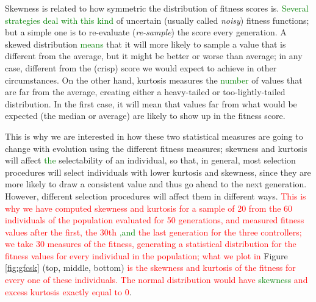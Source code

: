 \documentclass[10pt,journal,compsoc]{IEEEtran}
\begin{document}
Skewness is related to how symmetric the distribution of fitness
scores is.  \textcolor{green}{Several strategies deal with this kind} of
uncertain (usually called {\em noisy}) fitness functions; but a simple
one is to re-evaluate ({\em re-sample}) the score every generation. A
skewed distribution  \textcolor{green}{means} that it will more likely to sample a value
that is different from the average, but it might be better or worse
than average; in any case, different from the (crisp) score we would expect to
achieve in other circumstances. On the other hand, kurtosis measures
the  \textcolor{green}{number} of values that are far from the average, creating either a
heavy-tailed or too-lightly-tailed distribution. In the first case, it
will mean that values far from what would be expected (the median or average) are likely to
show up in the fitness score.

This is why we are interested in how these two statistical measures
are going to change with evolution using the different fitness measures; skewness and kurtosis will  affect  \textcolor{green}{the} selectability of an individual, so that, in general, most selection procedures will select
individuals with lower kurtosis and skewness, since they are more
likely to draw a consistent value and thus go ahead to the next
generation. However, different selection procedures will affect them
in different ways.  \textcolor{red}{This is why we have computed
  skewness and kurtosis for a sample of 20 from the 60 individuals of
  the population evaluated for 50 generations, and measured fitness
  values after the first, the 30th  \textcolor{green}{,and} the last generation for the
  three controllers;} \textcolor{red}{we take 30 measures of the
  fitness, generating a statistical distribution for the fitness
  values for every individual in the population; what we plot in}
Figure \ref{fig:gfcsk} (top, middle, bottom) \textcolor{red}{is the
  skewness and kurtosis of the fitness for every one of these
  individuals. The normal distribution would have  \textcolor{green}{ skewness} and
  excess kurtosis exactly equal to 0}.
\end{document}
